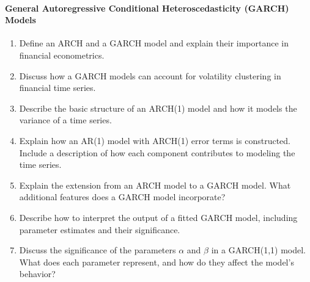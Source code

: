 \paragraph*{General Autoregressive Conditional Heteroscedasticity (GARCH) Models}
\begin{enumerate}
    \item Define an ARCH and a GARCH model and explain their importance in financial econometrics.
    \item Discuss how a GARCH models can account for volatility clustering in financial time series.
    \item Describe the basic structure of an ARCH(1) model and how it models the variance of a time series.
    \item Explain how an AR(1) model with ARCH(1) error terms is constructed. Include a description of how each component contributes to modeling the time series.
    \item Explain the extension from an ARCH model to a GARCH model. What additional features does a GARCH model incorporate?
    \item Describe how to interpret the output of a fitted GARCH model, including parameter estimates and their significance.
    \item Discuss the significance of the parameters $\alpha$ and $\beta$ in a GARCH(1,1) model. What does each parameter represent, and how do they affect the model's behavior?
\end{enumerate}
